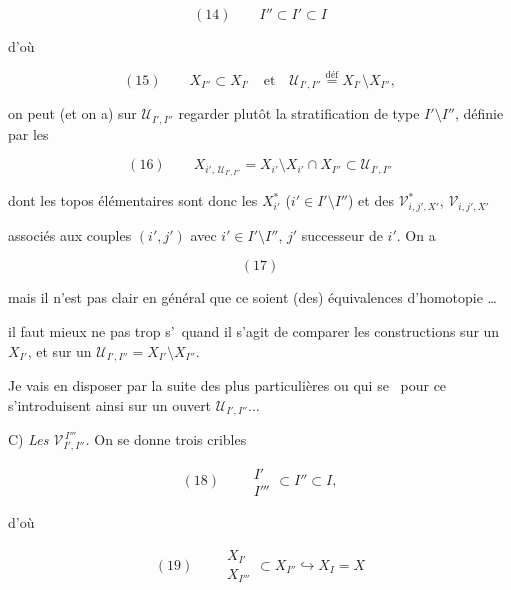 \documentclass[11pt,a4paper]{article}
\begin{document}
\[
  (14) \qquad I'' \subset I' \subset I
\]

d'où

\[
  (15) \qquad X_{I''} \subset X_{I'} \quad \text{et} \quad
  \mathcal{U}_{I',I''} \overset{\text{déf}}{=} X_{I'} \setminus X_{I''} ,
\]

on peut \struck{\ill} (et on a) sur $\mathcal{U}_{I',I''}$ regarder plutôt la
 stratification de type $I' \setminus I''$, définie par les

\[
  (16) \qquad
  X_{i',\, \mathcal{U}_{I',I''}}
  = X_{i'} \setminus X_{i'} \cap X_{I''} \subset \mathcal{U}_{I',I''}
\]

dont les topos élémentaires sont donc les $X_{i'}^{*}$
($i' \in I' \setminus I''$) et des $\mathcal{V}^{*}_{i,j',X'}$,
$\mathcal{V}_{i,j',X'}$

associés aux couples $(i',j')$ avec $i' \in I' \setminus I''$, $j'$ successeur
de $i'$. On a

\[
  (17)
\]


mais il n'est pas clair en général que ce soient 
 (des) équivalences d'homotopie …

 il faut mieux ne pas trop s'\ill\ quand il s'agit de comparer les
constructions sur un $X_{I'}$, et sur un
$\mathcal{U}_{I',I''} = X_{I'} \setminus X_{I''}$.

Je vais en disposer par la suite des \struck{\ill} plus particulières ou qui se
\ill\ pour ce s'introduisent ainsi sur un ouvert $\mathcal{U}_{I',I''} \ldots$



C) \emph{Les $\mathcal{V}^{\,I'''}_{I',I''}$.} On se donne trois cribles

\[
  (18) \qquad
  \begin{array}{c} I' \\ I''' \end{array} \subset I'' \subset I ,
\]

d'où

\[
  (19) \qquad
  \begin{array}{c} X_{I'} \\ X_{I'''} \end{array}
  \subset X_{I''} \hookrightarrow X_I = X
\]
\end{document}

